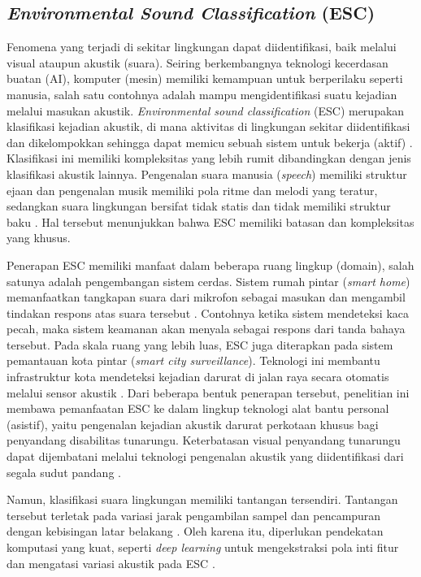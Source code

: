 \subsection{\textit{Environmental Sound Classification} (ESC)} \label{II.Teori1}
Fenomena yang terjadi di sekitar lingkungan dapat diidentifikasi, baik melalui visual ataupun akustik (suara).
Seiring berkembangnya teknologi kecerdasan buatan (AI), komputer (mesin) memiliki kemampuan untuk berperilaku seperti manusia, salah satu contohnya adalah mampu mengidentifikasi suatu kejadian melalui masukan akustik. 
\textit{Environmental sound classification} (ESC) merupakan klasifikasi kejadian akustik, di mana aktivitas di lingkungan sekitar diidentifikasi dan dikelompokkan sehingga dapat memicu sebuah sistem untuk bekerja (aktif) \cite{bansal2022environmental}.
Klasifikasi ini memiliki kompleksitas yang lebih rumit dibandingkan dengan jenis klasifikasi akustik lainnya.
Pengenalan suara manusia (\textit{speech}) memiliki struktur ejaan dan pengenalan musik memiliki pola ritme dan melodi yang teratur, sedangkan suara lingkungan bersifat tidak statis dan tidak memiliki struktur baku \cite{bansal2022environmental}.
Hal tersebut menunjukkan bahwa ESC memiliki batasan dan kompleksitas yang khusus. \par

Penerapan ESC memiliki manfaat dalam beberapa ruang lingkup (domain), salah satunya adalah pengembangan sistem cerdas.
Sistem rumah pintar (\textit{smart home}) memanfaatkan tangkapan suara dari mikrofon sebagai masukan dan mengambil tindakan respons atas suara tersebut \cite{tremblay_exploiting}.
Contohnya ketika sistem mendeteksi kaca pecah, maka sistem keamanan akan menyala sebagai respons dari tanda bahaya tersebut.
Pada skala ruang yang lebih luas, ESC juga diterapkan pada sistem pemantauan kota pintar (\textit{smart city surveillance}).
Teknologi ini membantu infrastruktur kota mendeteksi kejadian darurat di jalan raya secara otomatis melalui sensor akustik \cite{zhang2023automatic}. 
Dari beberapa bentuk penerapan tersebut, penelitian ini membawa pemanfaatan ESC ke dalam lingkup teknologi alat bantu personal (asistif), yaitu pengenalan kejadian akustik darurat perkotaan khusus bagi penyandang disabilitas tunarungu.
Keterbatasan visual penyandang tunarungu dapat dijembatani melalui teknologi pengenalan akustik yang diidentifikasi dari segala sudut pandang \cite{bansal2022environmental}. \par

Namun, klasifikasi suara lingkungan memiliki tantangan tersendiri.
Tantangan tersebut terletak pada variasi jarak pengambilan sampel dan pencampuran dengan kebisingan latar belakang \cite{bansal2022environmental}.
Oleh karena itu, diperlukan pendekatan komputasi yang kuat, seperti \textit{deep learning} untuk mengekstraksi pola inti fitur dan mengatasi variasi akustik pada ESC \cite{piczak2015environmental}. \par

